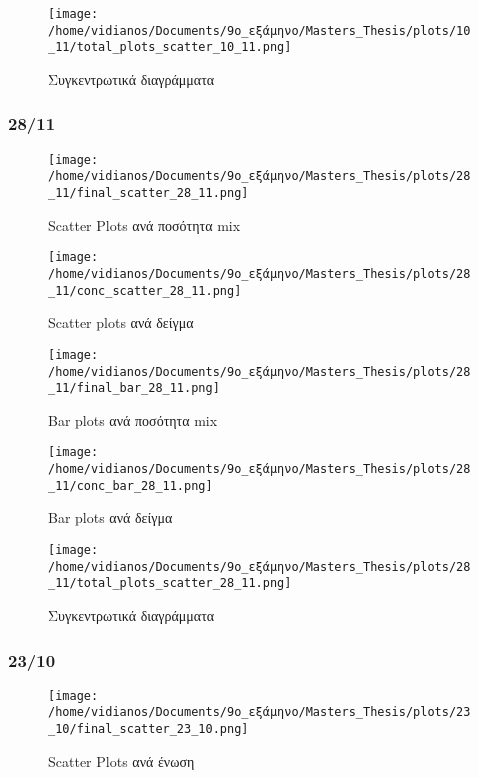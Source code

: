 \documentclass[11pt]{article}
\begin{document}
\begin{figure}[htbp]
\centering
\texttt{[image: /home/vidianos/Documents/9o\_εξάμηνο/Masters\_Thesis/plots/10\_11/total\_plots\_scatter\_10\_11.png]}
\caption{Συγκεντρωτικά διαγράμματα}
\end{figure}

\pagebreak

\subsubsection{28/11}
\label{sec:org0ef46ee}

\begin{figure}[htbp]
\centering
\texttt{[image: /home/vidianos/Documents/9o\_εξάμηνο/Masters\_Thesis/plots/28\_11/final\_scatter\_28\_11.png]}
\caption{Scatter Plots ανά ποσότητα mix}
\end{figure}

\begin{figure}[htbp]
\centering
\texttt{[image: /home/vidianos/Documents/9o\_εξάμηνο/Masters\_Thesis/plots/28\_11/conc\_scatter\_28\_11.png]}
\caption{Scatter plots ανά δείγμα}
\end{figure}

\begin{figure}[htbp]
\centering
\texttt{[image: /home/vidianos/Documents/9o\_εξάμηνο/Masters\_Thesis/plots/28\_11/final\_bar\_28\_11.png]}
\caption{Bar plots ανά ποσότητα mix}
\end{figure}

\begin{figure}[htbp]
\centering
\texttt{[image: /home/vidianos/Documents/9o\_εξάμηνο/Masters\_Thesis/plots/28\_11/conc\_bar\_28\_11.png]}
\caption{Bar plots ανά δείγμα}
\end{figure}

\begin{figure}[htbp]
\centering
\texttt{[image: /home/vidianos/Documents/9o\_εξάμηνο/Masters\_Thesis/plots/28\_11/total\_plots\_scatter\_28\_11.png]}
\caption{Συγκεντρωτικά διαγράμματα}
\end{figure}

\pagebreak
\subsubsection{23/10}
\label{sec:org2b77eae}
\begin{figure}[htbp]
\centering
\texttt{[image: /home/vidianos/Documents/9o\_εξάμηνο/Masters\_Thesis/plots/23\_10/final\_scatter\_23\_10.png]}
\caption{Scatter Plots ανά ένωση}
\end{figure}
\end{document}
